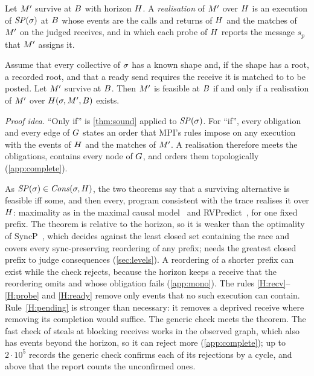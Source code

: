\begin{definition}[Realisation]
Let $M'$ survive at $B$ with horizon $H$. A \emph{realisation} of $M'$ over
$H$ is an execution of $\mathit{SP}(\sigma)$ at $B$ whose events are the calls and returns of
$H$ and the matches of $M'$ on the judged receives, and in which each probe of $H$
reports the message $s_p$ that $M'$ assigns it.
\end{definition}

\begin{theorem}[Completeness]
\label{thm:complete}
Assume that every collective of $\sigma$ has a known shape and, if the shape has a root, a
recorded root, and that a ready send requires the receive it is matched to to be posted. Let
$M'$ survive at $B$. Then $M'$ is feasible at $B$ if and only if a realisation of
$M'$ over $H(\sigma,M',B)$ exists.
\end{theorem}

\noindent\emph{Proof idea.} ``Only if'' is \cref{thm:sound} applied to $\mathit{SP}(\sigma)$. For
``if'', every obligation and every edge of $G$ states an order that MPI's rules impose on
any execution with the events of $H$ and the matches of $M'$. A realisation therefore
meets the obligations, contains every node of $G$, and orders them topologically
(\cref{app:complete}).

As $\mathit{SP}(\sigma)\in\mathit{Cons}(\sigma,H)$, the two theorems say that a surviving alternative is
feasible iff some, and then every, program consistent with the trace realises it over
$H$: maximality as in the maximal causal model~\citep{serbanuta12mcm} and
RVPredict~\citep{huang14rvpredict}, for one fixed prefix.
The theorem is relative to the horizon, so it is weaker than the
optimality of SyncP~\citep{mathur21syncp}, which decides against the least closed set
containing the race and covers every sync-preserving reordering of any prefix; \tool needs the
greatest closed prefix to judge consequences (\cref{sec:levels}). A reordering of a shorter
prefix can exist while the check rejects, because the horizon keeps a receive that the
reordering omits and whose obligation fails (\cref{app:mono}). The rules
\ref{H:recv}--\ref{H:probe} and \ref{H:ready} remove only events that no such execution can
contain. Rule~\ref{H:pending} is stronger than necessary: it removes a deprived receive where
removing its completion would suffice.
The generic check meets the theorem. The fast check of steals at blocking receives works in
the observed graph, which also has events beyond the horizon, so it can reject more
(\cref{app:complete}); up to $2\cdot10^5$ records the generic check confirms each of its
rejections by a cycle, and above that the report counts the unconfirmed ones.

